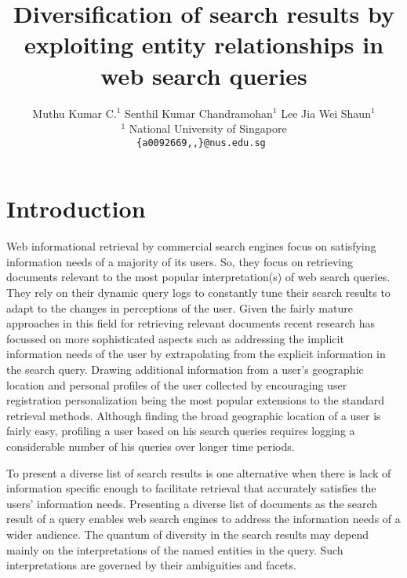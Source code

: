 \documentclass[11pt]{article}
\title{Diversification of search results by exploiting entity relationships in
web search queries}
\author{Muthu Kumar C.$^{1}$ \hspace{1.1cm}  Senthil Kumar Chandramohan$^{1}$ \hspace{1.1cm} Lee Jia Wei Shaun$^{1}$ \\
 {$^{1}$ National University of Singapore }\\
 {\tt \{a0092669,,\}@nus.edu.sg }%
 }
\date{}
\begin{document}
\maketitle
\begin{abstract}
 
\end{abstract}


\section{Introduction}
\label{intro}
Web informational retrieval by commercial search engines focus on 
satisfying information needs of a majority of its users. So, they 
focus on retrieving documents relevant to the most popular interpretation(s) 
of web search queries. They rely on their dynamic query logs to constantly tune their 
search results to adapt to the changes in perceptions of the user. Given the
fairly mature approaches in this field for retrieving relevant documents 
recent research has focussed on more sophisticated aspects such as addressing 
the implicit information needs of the user by extrapolating from the explicit 
information in the search query. Drawing additional information from a user's geographic 
location and personal profiles of the user collected by encouraging user registration 
personalization being the most popular extensions to the standard retrieval methods. 
Although finding the broad geographic location of a user is fairly easy, profiling a
user based on his search queries requires logging a considerable number of his queries 
over longer time periods. 

To present a diverse list of search results is one alternative when there is lack 
of information specific enough to facilitate retrieval that accurately satisfies the 
users' information needs. Presenting a diverse list of documents as the search result 
of a query enables web search engines to address the information needs of a wider 
audience. The quantum of diversity in the search results may depend mainly on the 
interpretations of the named entities in the query.
Such interpretations are governed by their ambiguities and facets.
\end{document}
